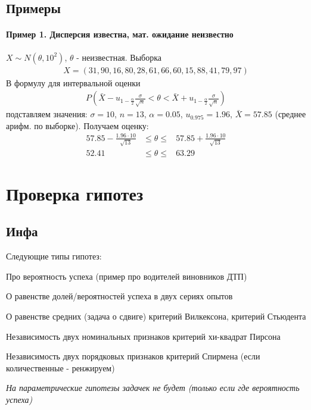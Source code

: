 \documentclass[12pt]{extarticle}
\begin{document}
\subsection{Примеры}
\paragraph{Пример 1. Дисперсия известна, мат. ожидание неизвестно}
$X\sim N(\theta, 10^{2})$, $\theta$ - неизвестная. Выборка
\begin{eqnarray*}
X = (31,90,16,80,28,61,66,60,15,88,41,79,97)
\end{eqnarray*}
В формулу для интервальной оценки
\begin{eqnarray*}
    P(
    \bar{X}-u_{1-\frac{\alpha}{2}}\frac{\sigma}{\sqrt{n}}
    < \theta <
    \bar{X}+u_{1-\frac{\alpha}{2}}\frac{\sigma}{\sqrt{n}})
\end{eqnarray*}
подставляем значения: $\sigma=10$, $n=13$, $\alpha=0.05$,
$u_{0.975}=1.96$, $\bar{X}=57.85$ (среднее арифм. по выборке). Получаем
оценку:
\begin{eqnarray*}
     57.85-\frac{1.96\cdot 10}{\sqrt{13}}
    &\leqslant\theta\leqslant&
    57.85+\frac{1.96\cdot 10}{\sqrt{13}}\\
    52.41& \leqslant \theta \leqslant & 63.29
\end{eqnarray*}



\section{Проверка гипотез}

\subsection{Инфа}
Следующие типы гипотез:
\begin{description}
    \item Про вероятность успеха (пример про водителей
        виновников ДТП)
    \item О равенстве долей/вероятностей успеха в двух сериях
        опытов
    \item О равенстве средних (задача о сдвиге)
        \subitem критерий Вилкексона, критерий Стьюдента
    \item Независимость двух номинальных признаков
        \subitem критерий хи-квадрат Пирсона
    \item Независимость двух порядковых признаков
        \subitem критерий Спирмена (если количественные - ренжируем)
\end{description}
\textit{На параметрические гипотезы задачек не будет (только если где
вероятность успеха)}
\end{document}
